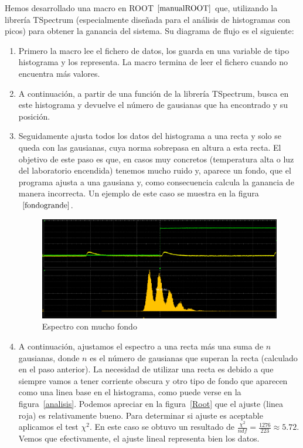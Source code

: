 Hemos desarrollado una macro en ROOT$~\cite{manualROOT}$ que, utilizando la librería TSpectrum (especialmente diseñada para el análisis de histogramas con picos) para obtener la ganancia del sistema. Su diagrama de flujo es el siguiente:
\begin{enumerate}
\item {} Primero la macro lee el fichero de datos, los guarda en una variable de tipo histograma y los representa. La macro termina de leer el fichero cuando no encuentra más valores.

\item {} A continuación, a partir de una función de la librería TSpectrum, busca en este histograma y devuelve el número de gausianas que ha encontrado y su posición.

\item {} Seguidamente ajusta todos los datos del histograma a una recta y solo se queda con las gausianas, cuya norma sobrepasa en altura a esta recta. El objetivo de este paso es que, en casos muy concretos (temperatura alta o luz del laboratorio encendida) tenemos mucho ruido y, aparece un fondo,  que el programa ajusta a una gausiana y, como consecuencia calcula la ganancia de manera incorrecta. Un ejemplo de este caso se muestra en la figura$~\ref{fondogrande}$.

\begin{figure}[hbtp]
\centering
\includegraphics[scale=0.4]{fondogaussiano.png}
\caption{Espectro con mucho fondo\label{fondogrande}}
\end{figure}

\item {} A continuación, ajustamos el espectro a una recta más una suma de $n$ gausianas, donde $n$ es el número de gausianas que superan la recta (calculado en el paso anterior). La necesidad de utilizar una recta es debido a que siempre vamos a tener corriente obscura y otro tipo de fondo que aparecen como una linea base en el histograma, como puede verse en la figura~\ref{analisis}. Podemos apreciar en la figura~\ref{Root} que el ajuste (linea roja) es relativamente bueno. Para determinar si ajuste es aceptable aplicamos el test $\chi^2$. En este caso se obtuvo un resultado de $\frac{\chi^2}{ndf}=\frac{1276}{223}\approx 5.72$. Vemos que efectivamente, el ajuste lineal representa bien los datos.


\end{enumerate}
